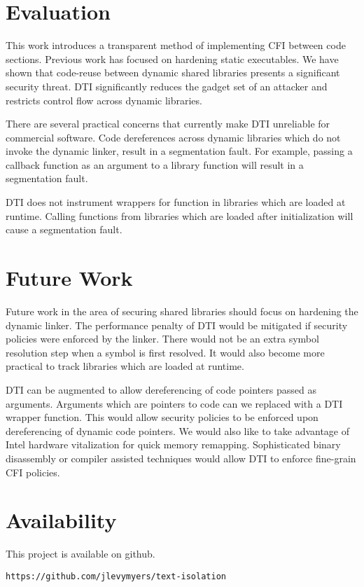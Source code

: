 \documentclass[letterpaper,twocolumn,10pt]{article}
\begin{document}
\section{Evaluation}
    
    This work introduces a transparent method of implementing CFI between code sections. Previous work has focused on hardening static executables. We have shown that code-reuse between dynamic shared libraries presents a significant security threat. DTI significantly reduces the gadget set of an attacker and restricts control flow across dynamic libraries. 
    
    There are several practical concerns that currently make DTI unreliable for commercial software. Code dereferences across dynamic libraries which do not invoke the dynamic linker, result in a segmentation fault. 
    For example, passing a callback function as an argument to a library function will result in a segmentation fault. 
    
    DTI does not instrument wrappers for function in libraries which are loaded at runtime. Calling functions from libraries which are loaded after initialization will cause a segmentation fault. 
    
\section{Future Work}

    Future work in the area of securing shared libraries should focus on hardening the dynamic linker. The performance penalty of DTI would be mitigated if security policies were enforced by the linker. There would not be an extra symbol resolution step when a symbol is first resolved. It would also become more practical to track libraries which are loaded at runtime. 
    
    DTI can be augmented to allow dereferencing of code pointers passed as arguments. Arguments which are pointers to code can we replaced with a DTI wrapper function. This would allow security policies to be enforced upon dereferencing of dynamic code pointers. We would also like to take advantage of  Intel hardware vitalization \cite{Readactor} for quick memory remapping. Sophisticated binary disassembly or compiler assisted techniques would allow DTI to enforce fine-grain CFI \cite{COTS} policies. 
    
\section{Availability}
This project is available on github.
\begin{center}
{\tt https://github.com/jlevymyers/text-isolation
}\end{center}

{\footnotesize 
}
\end{document}
